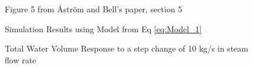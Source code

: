         \begin{figure}[ht]
            \begin{center}
                
                Figure 5 from \r{A}str\"{o}m and Bell's paper, section 5 \cite{Astrom}
                
                
                Simulation Results using Model from Eq \eqref{eq:Model_1}
                
                \caption{Total Water Volume Response to a step change of 10 kg/s in steam flow rate}
                \label{fig:Fig5A}
            \end{center}
        \end{figure}
